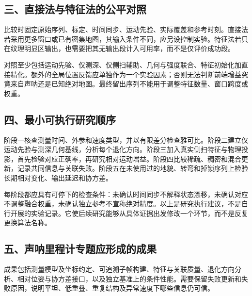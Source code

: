 \hypertarget{ux4e09ux76f4ux63a5ux6cd5ux4e0eux7279ux5f81ux6cd5ux7684ux516cux5e73ux5bf9ux7167}{%
\subsection{三、直接法与特征法的公平对照}\label{ux4e09ux76f4ux63a5ux6cd5ux4e0eux7279ux5f81ux6cd5ux7684ux516cux5e73ux5bf9ux7167}}

比较时固定原始序列、标定、时间同步、运动先验、实际覆盖和参考时刻。直接法若采用更多窗口或已有密集地图，其输入条件不同，应另设控制实验。特征法若只在纹理明显区输出，也需要把其无输出段计入可用率，而不是仅评价成功段。

对照至少包括运动先验、仅测深、仅侧扫辅助、几何与强度联合、特征初始化加直接精化。额外的全局位置反馈应单独作为一个实验因素；否则无法判断前端增益究竟来自声呐还是已知绝对地图。最终留出序列不能用于调整特征数量、窗口跨度或权重。

\hypertarget{ux56dbux6700ux5c0fux53efux6267ux884cux7814ux7a76ux987aux5e8f}{%
\subsection{四、最小可执行研究顺序}\label{ux56dbux6700ux5c0fux53efux6267ux884cux7814ux7a76ux987aux5e8f}}

阶段一核查测量时间、外参和速度类型，并以有限差分检查雅可比。阶段二建立仅运动先验与测深几何基线，分析每个退化方向。阶段三加入真实侧扫特征与物理投影，首先检验对应正确率，再研究相对运动增益。阶段四比较稀疏、稠密和混合更新，记录共同信息与关联失败。阶段五在未使用过的地貌、转弯和掉锁序列上检验长期相对变化、输出延迟和协方差。

每阶段都应具有可停下的检查条件：未确认时间同步不解释状态漂移，未确认对应不调整融合权重，未确认独立参考不宣称绝对精度。以上是研究执行建议，不是自行开展的实验记录。它使后续研究能够从具体证据出发修改一个环节，而不是反复更换算法名称。

\hypertarget{ux4e94ux58f0ux5450ux91ccux7a0bux8ba1ux4e13ux9898ux5e94ux5f62ux6210ux7684ux6210ux679c}{%
\subsection{五、声呐里程计专题应形成的成果}\label{ux4e94ux58f0ux5450ux91ccux7a0bux8ba1ux4e13ux9898ux5e94ux5f62ux6210ux7684ux6210ux679c}}

成果包括测量模型及坐标约定、可追溯子帧构建、特征与关联质量、退化方向分析、相对位姿与协方差接口，以及独立基准上的条件性能。需要保留失败更新和失败原因，说明平坦、低重叠、重复结构及异常速度下哪些信息仍可信。

